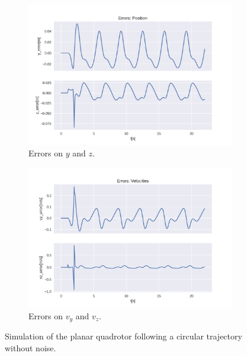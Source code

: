 \documentclass{thesisreport}
\begin{document}
\begin{figure}[H]
\medskip
	\begin{subfigure}{0.48\textwidth}
		\includegraphics[width=\linewidth]{Images/acados_simulations/circular_trajectory/planar_quadrotor/noiseless/Errors_position.png}
		\caption{Errors on $y$ and $z$.} \label{fig:planar_sim_error_pose_noiseless}
	\end{subfigure}\hspace*{\fill}
	\begin{subfigure}{0.48\textwidth}
		\includegraphics[width=\linewidth]{Images/acados_simulations/circular_trajectory/planar_quadrotor/noiseless/Errors_velocities.png}
		\caption{Errors on $v_y$ and $v_z$.} \label{fig:planar_sim_error_velocities_noiseless}
	\end{subfigure}

	\caption{Simulation of the planar quadrotor following a circular trajectory without noise.} \label{fig:planar_sim_noiseless}
\end{figure}
\end{document}
